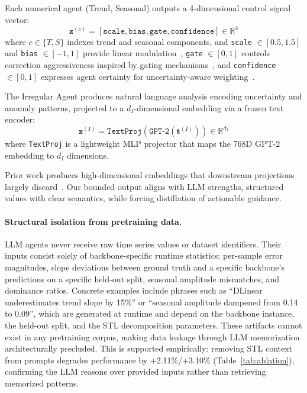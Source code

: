 Each numerical agent (Trend, Seasonal) outputs a 4-dimensional control signal vector:
\begin{equation}
    \mathbf{z}^{(c)} = [\texttt{scale}, \texttt{bias}, \texttt{gate}, \texttt{confidence}] \in \mathbb{R}^4
\end{equation}
where $c \in \{T, S\}$ indexes trend and seasonal components, and \texttt{scale} $\in [0.5, 1.5]$ and \texttt{bias} $\in [-1, 1]$ provide linear modulation~\cite{perez2018film}, \texttt{gate} $\in [0, 1]$ controls correction aggressiveness inspired by gating mechanisms~\cite{hochreiter1997lstm}, and \texttt{confidence} $\in [0, 1]$ expresses agent certainty for uncertainty-aware weighting~\cite{xiong2024llms-conf,geng2024survey-conf}.

The Irregular Agent produces natural language analysis encoding uncertainty and anomaly patterns, projected to a $d_I$-dimensional embedding via a frozen text encoder:
\begin{equation}
    \mathbf{z}^{(I)} = \texttt{TextProj}(\texttt{GPT-2}(\mathbf{t}^{(I)})) \in \mathbb{R}^{d_I}
\end{equation}
where \texttt{TextProj} is a lightweight MLP projector that maps the 768D GPT-2 embedding to $d_I$ dimensions.

Prior work produces high-dimensional embeddings that downstream projections largely discard~\cite{Tan2024LLMUseful}. Our bounded output aligns with LLM strengths, structured values with clear semantics, while forcing distillation of actionable guidance.


\paragraph{Structural isolation from pretraining data.} LLM agents never receive raw time series values or dataset identifiers. Their inputs consist solely of backbone-specific runtime statistics: per-sample error magnitudes, slope deviations between ground truth and a specific backbone's predictions on a specific held-out split, seasonal amplitude mismatches, and dominance ratios. Concrete examples include phrases such as ``DLinear underestimates trend slope by 15\%'' or ``seasonal amplitude dampened from 0.14 to 0.09'', which are generated at runtime and depend on the backbone instance, the held-out split, and the STL decomposition parameters. These artifacts cannot exist in any pretraining corpus, making data leakage through LLM memorization architecturally precluded. This is supported empirically: removing STL context from prompts degrades performance by +2.11\%/+3.10\% (Table~\ref{tab:ablation}), confirming the LLM reasons over provided inputs rather than retrieving memorized patterns.



